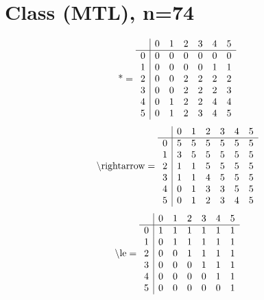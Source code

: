\documentclass[11pt]{article}
\begin{document}
\section{Class (MTL), n=74}
\[\text{*} = 
\begin{array}{r | r r r r r r}
 & 0 & 1 & 2 & 3 & 4 & 5 \\ \hline
0 & 0 & 0 & 0 & 0 & 0 & 0 \\
1 & 0 & 0 & 0 & 0 & 1 & 1 \\
2 & 0 & 0 & 2 & 2 & 2 & 2 \\
3 & 0 & 0 & 2 & 2 & 2 & 3 \\
4 & 0 & 1 & 2 & 2 & 4 & 4 \\
5 & 0 & 1 & 2 & 3 & 4 & 5 \\
\end{array}
\]
\[\text{\textbackslash rightarrow} = 
\begin{array}{r | r r r r r r}
 & 0 & 1 & 2 & 3 & 4 & 5 \\ \hline
0 & 5 & 5 & 5 & 5 & 5 & 5 \\
1 & 3 & 5 & 5 & 5 & 5 & 5 \\
2 & 1 & 1 & 5 & 5 & 5 & 5 \\
3 & 1 & 1 & 4 & 5 & 5 & 5 \\
4 & 0 & 1 & 3 & 3 & 5 & 5 \\
5 & 0 & 1 & 2 & 3 & 4 & 5 \\
\end{array}
\]
\[\text{\textbackslash le} = 
\begin{array}{r | r r r r r r}
 & 0 & 1 & 2 & 3 & 4 & 5 \\ \hline
0 & 1 & 1 & 1 & 1 & 1 & 1 \\
1 & 0 & 1 & 1 & 1 & 1 & 1 \\
2 & 0 & 0 & 1 & 1 & 1 & 1 \\
3 & 0 & 0 & 0 & 1 & 1 & 1 \\
4 & 0 & 0 & 0 & 0 & 1 & 1 \\
5 & 0 & 0 & 0 & 0 & 0 & 1 \\
\end{array}
\]
\end{document}

